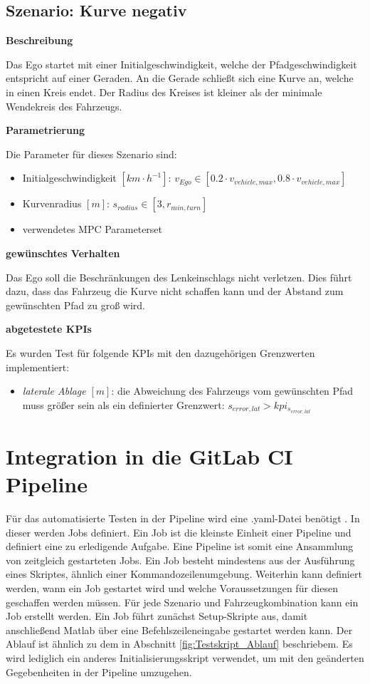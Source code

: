 \subsection{Szenario: Kurve negativ} \label{subsec:kurveNegativ}
\textbf{Beschreibung}

\noindent Das Ego startet mit einer Initialgeschwindigkeit, welche der Pfadgeschwindigkeit entspricht auf einer Geraden. An die Gerade schließt sich eine Kurve an, welche in einen Kreis endet. Der Radius des Kreises ist kleiner als der minimale Wendekreis des Fahrzeugs. 

\bigskip\noindent\textbf{Parametrierung}

\noindent Die Parameter für dieses Szenario sind:
\begin{itemize}
    \item Initialgeschwindigkeit $[km\cdot h^{-1}]$: $v_{Ego} \in [0.2\cdot v_{vehicle,max}, 0.8\cdot v_{vehicle,max}]$
    \item Kurvenradius $[m]$: $s_{radius} \in [3,r_{min,turn}]$
    \item verwendetes MPC Parameterset
\end{itemize}

\bigskip\noindent\textbf{gewünschtes Verhalten}

\noindent Das Ego soll die Beschränkungen des Lenkeinschlags nicht verletzen. Dies führt dazu, dass das Fahrzeug die Kurve nicht schaffen kann und der Abstand zum gewünschten Pfad zu groß wird.

\bigskip\noindent\textbf{abgetestete KPIs}

\noindent Es wurden Test für folgende KPIs mit den dazugehörigen Grenzwerten implementiert:
\begin{itemize}
    \item \textit{laterale Ablage} $[m]$: die Abweichung des Fahrzeugs vom gewünschten Pfad muss größer sein als ein definierter Grenzwert: $s_{error,lat} > kpi_{s_{error,lat}}$
\end{itemize}



\section{Integration in die GitLab CI Pipeline} \label{sec:CIPipeline}
Für das automatisierte Testen in der Pipeline wird eine .yaml-Datei benötigt \cite{GitLabDoks}. In dieser werden Jobs definiert. Ein Job ist die kleinste Einheit einer Pipeline und definiert eine zu erledigende Aufgabe. Eine Pipeline ist somit eine Ansammlung von zeitgleich gestarteten Jobs. Ein Job besteht mindestens aus der Ausführung eines Skriptes, ähnlich einer Kommandozeilenumgebung. Weiterhin kann definiert werden, wann ein Job gestartet wird und welche Voraussetzungen für diesen geschaffen werden müssen.
Für jede Szenario und Fahrzeugkombination kann ein Job erstellt werden. Ein Job führt zunächst Setup-Skripte aus, damit anschließend Matlab über eine Befehlszeileneingabe gestartet werden kann. Der Ablauf ist ähnlich zu dem in Abschnitt \ref{fig:Testskript_Ablauf} beschriebem. Es wird lediglich ein anderes Initialisierungsskript verwendet, um mit den geänderten Gegebenheiten in der Pipeline umzugehen.

